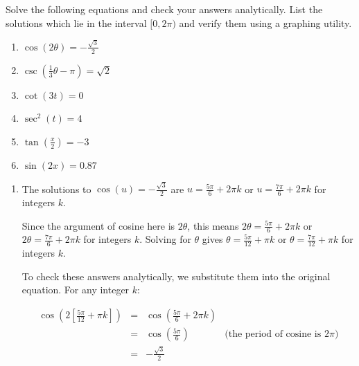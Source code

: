 \documentclass{ximera}
\begin{document}
\begin{example}  \label{TrigEqnEx1} Solve the following equations and check your answers analytically.  List the solutions which lie in the interval $[0,2\pi)$ and verify them using a graphing utility.

\begin{enumerate}

\item  $\cos(2\theta) = -\frac{\sqrt{3}}{2}$
\item  $\csc\left(\frac{1}{3}\theta-\pi \right) = \sqrt{2}$
\item  $\cot\left(3t \right) = 0$

\item  $\sec^{2}(t) = 4$
\item  \label{arctanin02pi} $\tan\left(\frac{x}{2}\right) = -3$
\item  $\sin(2x) = 0.87$

\end{enumerate}



\begin{explanation}

\begin{enumerate}

\item  The solutions to $\cos(u) =-\frac{\sqrt{3}}{2}$ are $u = \frac{5\pi}{6} + 2\pi k$ or $u = \frac{7\pi}{6} + 2\pi k$ for integers $k$.  

 

Since the argument of cosine here is $2\theta$, this means $2\theta = \frac{5\pi}{6} + 2\pi k$ or $2\theta = \frac{7\pi}{6} + 2\pi k$ for integers $k$.  Solving for $\theta$ gives $\theta = \frac{5\pi}{12} + \pi k$ or $\theta = \frac{7\pi}{12} + \pi k$ for integers $k$. 

 

 To check these answers analytically, we substitute them into the original equation.  For any integer $k$:

\[ \begin{array}{rclr}

\cos\left( 2\left[\frac{5\pi}{12} + \pi k\right]\right) &  = &  \cos\left(\frac{5\pi}{6} + 2\pi k\right) & \\   
& =  &   \cos\left(\frac{5\pi}{6}\right) & \text{(the period of cosine is $2\pi$)} \\   
& =  & -\frac{\sqrt{3}}{2} & \\
\end{array}\] 


\end{enumerate}
\end{explanation}
\end{example}
\end{document}
